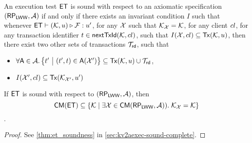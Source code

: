 \begin{definition}
\label{def:main-body-et_sound}
An execution test $\mathsf{ET}$ is sound with respect to an axiomatic 
specification $(\mathsf{RP}_{\mathsf{LWW}}, \mathcal{A})$ if and only if there exists an 
invariant condition $I$ such that whenever $\mathsf{ET} \vdash (\mathcal{K}, u) 
\triangleright \mathcal{F}: u'$, for any $\mathcal{X}$ such that 
$\mathcal{K}_{\mathcal{X}} = \mathcal{K}$, for any client ${cl}$, for any 
transaction identifier $t \in \mathsf{nextTxId}(\mathcal{K}, {cl})$, 
such that  $I(\mathcal{X}, {cl}) \subseteq \mathsf{Tx}(\mathcal{K}, u)$, then  
there exist two other sets of transactions $\mathcal{T}_{\mathsf{rd}}$, 
such that 
\begin{itemize}
\item $\forall \A \in \Ax. \Setcon{\txid' }{ (\txid', \txid) \in \A(\aexec')} \subseteq \Tx(\hh, \vi) \cup \T_{\rd}$, 
\item $I(\mathcal{X}', {cl}) \subseteq \mathsf{Tx}(\mathcal{K}_{\mathcal{X}'}, u')$
\end{itemize}
\end{definition}

\begin{theorem}
\label{thm:main-body-et_soundness}
If $\mathsf{ET}$ is sound with respect to $(\mathsf{RP}_{\mathsf{LWW}}, \mathcal{A})$, then 
\[
    \mathsf{CM}(\mathsf{ET}) \subseteq \{ \mathcal{K} \mid \exists \mathcal{X} \in \mathsf{CM}(\mathsf{RP}_{\mathsf{LWW}}, \mathcal{A})).\;\mathcal{K}_{\mathcal{X}} = \mathcal{K}\}
\].
\end{theorem}
\begin{proof}
    See \cref{thm:et_soundness} in \cref{sec:kv2aexec-sound-complete}.
\end{proof}


